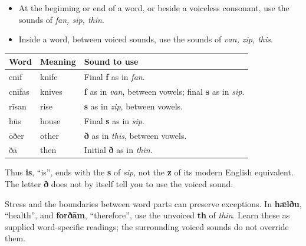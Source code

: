 \begin{itemize}
\item At the beginning or end of a word, or beside a voiceless consonant, use the sounds of \emph{fan, sip, thin}.

\item Inside a word, between voiced sounds, use the sounds of \emph{van, zip, this}.

\end{itemize}
\par\begingroup
\fontsize{10.5}{13.2}\selectfont
\setlength{\LTleft}{0pt}\setlength{\LTright}{\fill}
\noindent
\begin{tabular}{@{}>{\raggedright\arraybackslash}p{26.306mm}>{\raggedright\arraybackslash}p{26.306mm}>{\raggedright\arraybackslash}p{65.764mm}@{}}
\toprule
\textbf{Word} & \textbf{Meaning} & \textbf{Sound to use} \\
\midrule
cnīf & knife & Final \textbf{f} as in \emph{fan}. \\
cnīfas & knives & \textbf{f} as in \emph{van}, between vowels; final \textbf{s} as in \emph{sip}. \\
rīsan & rise & \textbf{s} as in \emph{zip}, between vowels. \\
hūs & house & Final \textbf{s} as in \emph{sip}. \\
ōðer & other & \textbf{ð} as in \emph{this}, between vowels. \\
ðā & then & Initial \textbf{ð} as in \emph{thin}. \\
\bottomrule
\end{tabular}
\par\endgroup

Thus \textbf{is}, “is”, ends with the \textbf{s} of \emph{sip}, not the \textbf{z} of its modern English equivalent. The letter \textbf{ð} does not by itself tell you to use the voiced sound.

Stress and the boundaries between word parts can preserve exceptions. In \textbf{hǣlðu}, “health”, and \textbf{forðām}, “therefore”, use the unvoiced \textbf{th} of \emph{thin}. Learn these as supplied word-specific readings; the surrounding voiced sounds do not override them.

